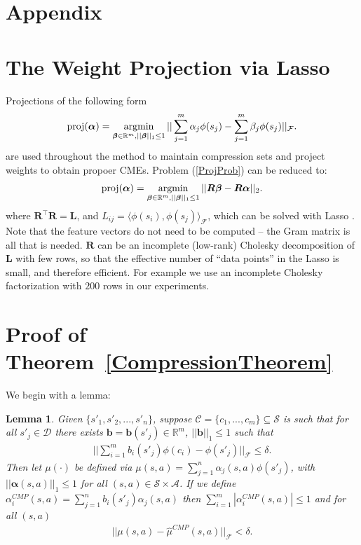 \documentclass[letterpaper]{article}
\newtheorem{lemma}[theorem]{Lemma}
\newcommand{\ShaweTaylorBook}{DBLP:books/daglib/0026002}
\newcommand{\TibshiraniLasso}{tibshirani96regression}
\newcommand{\cD}{{\mathcal D}}
\newcommand{\cC}{{\mathcal C}}
\newcommand{\cF}{{\mathcal F}}
\newcommand{\cA}{{\mathcal A}}
\newcommand{\cS}{{\mathcal S}}
\newcommand{\balpha}{{\bm \alpha}}
\newcommand{\bbeta}{{\bm \beta}}
\newcommand{\bL}{{\bm L}}
\newcommand{\bR}{{\bm R}}
\newcommand{\R}{{\mathbb R}}
\newcommand{\argmin}{\operatornamewithlimits{argmin}}
\newcommand{\lang}{\langle}
\newcommand{\rang}{\rangle}
\newcommand{\nn}{\nonumber}
\begin{document}
\appendix
\section*{Appendix}
\section{The Weight Projection via Lasso} \label{LassoSec}

Projections of the following form
\begin{align}
{\rm proj}(\balpha) = \argmin_{\bbeta \in \R^m, ||\bbeta||_1\le 1} || \sum_{j=1}^m \alpha_j \phi(s_j) - \sum_{j=1}^m \beta_j  \phi(s_j)  ||_{\cF}. \label{ProjProb}
\end{align}
are used throughout the method to maintain compression sets and project weights to obtain propoer CMEs. Problem (\ref{ProjProb}) can be reduced to:
\begin{align}
{\rm proj}(\balpha)  = \argmin_{\bbeta \in \R^m, ||\bbeta||_1\le 1} || \bR \bbeta - \bR \balpha ||_2. \nn
\end{align}
where $\bR^\top \bR = \bL$, and $L_{ij} = \lang \phi(s_i), \phi(s_j)\rang_\cF$, which can be solved with Lasso \citep{\TibshiraniLasso}. Note that the feature vectors do not need to be computed -- the Gram matrix is all that is needed. $\bR$ can be an incomplete  (low-rank) Cholesky decomposition \cite[see e.g.][]{\ShaweTaylorBook} of $\bL$ with few rows, so that the effective number of ``data points'' in the Lasso is small, and therefore efficient. For example we use an incomplete Cholesky factorization with $200$ rows in our experiments.

\section{Proof of Theorem~\ref{CompressionTheorem}} \label{learningCompressionAppendix}

We begin with a lemma:

\begin{lemma}\label{CMPlemma} Given $\{s'_1,s'_2,...,s'_n\}$, suppose $\cC = \{ c_1,...,c_m \}\subseteq \cS$ is such that for all $s'_j\in\cD$ there exists ${\bm b} = {\bm b}(s'_j)\in\R^m$, $||\bm b||_1\le 1$ such that
\begin{align}
||\sum_{i=1}^m b_i(s'_j) \phi(c_i) - \phi(s'_j)||_{\cF} \le \delta. \label{Ccondition}
\end{align}
Then let $\mu(\cdot)$ be defined via $\mu(s,a) = \sum_{j=1}^n \alpha_j(s,a) \phi(s'_j)$, with $||\balpha(s,a)||_1\le 1$ for all $(s,a)\in\cS\times\cA$. 
If we define $\alpha^{CMP}_i(s,a)=\sum_{j=1}^n b_i(s'_j) \alpha_j(s,a)$ then $\sum_{i=1}^m |\alpha^{CMP}_i(s,a)|\le 1$ and for all $(s,a)$
\begin{align}
||\mu(s,a) - \hat\mu^{CMP}(s,a)||_\cF < \delta. \nn
\end{align}
\end{lemma}
\end{document}

